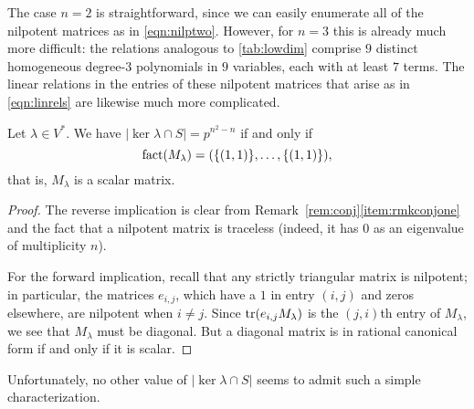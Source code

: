 \begin{rem}
The case $n=2$ is straightforward, since we can easily enumerate all of the nilpotent matrices as in \eqref{eqn:nilptwo}. However, for $n=3$ this is already much more difficult: the relations analogous to \eqref{tab:lowdim} comprise $9$ distinct homogeneous degree-$3$ polynomials in $9$ variables, each with at least $7$ terms. The linear relations in the entries of these nilpotent matrices that arise as in \eqref{eqn:linrels} are likewise much more complicated.
\end{rem}

\begin{prop}
Let $\lambda\in V^*$. We have $|\ker\lambda\cap S|=p^{n^2-n}$ if and only if
\begin{equation*}
\operatorname{fact}(M_\lambda)=(\{(1,1)\},\ldots,\{(1,1)\}),
\end{equation*}
that is, $M_\lambda$ is a scalar matrix.
\end{prop}
\begin{proof}
The reverse implication is clear from Remark~\ref{rem:conj}\eqref{item:rmkconjone} and the fact that a nilpotent matrix is traceless (indeed, it has $0$ as an eigenvalue of multiplicity $n$).

For the forward implication, recall that any strictly triangular matrix is nilpotent; in particular, the matrices $e_{i,j}$, which have a $1$ in entry $(i,j)$ and zeros elsewhere, are nilpotent when $i\ne j$. Since $\operatorname{tr}(e_{i,j}M_\lambda)$ is the $(j,i)$th entry of $M_\lambda$, we see that $M_\lambda$ must be diagonal. But a diagonal matrix is in rational canonical form if and only if it is scalar.
\end{proof}

Unfortunately, no other value of $|\ker\lambda\cap S|$ seems to admit such a simple characterization.

